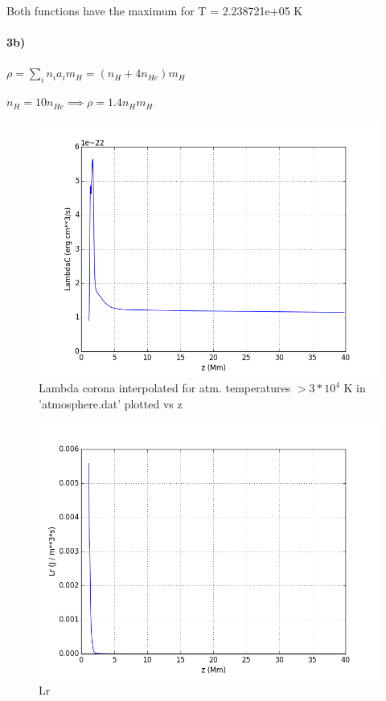 \documentclass[10pt]{book}
\begin{document}
Both functions have the maximum for T = 2.238721e+05 K

\paragraph{3b)}

$\rho = \sum_i n_i a_i m_H = (n_H + 4 n_{He}) m_H $

$n_H = 10 n_{He} \implies \rho = 1.4 n_H m_H$

\begin{figure}[H]
 \centering
 \includegraphics[scale=0.5]{interpLambdaC.png}
 \caption{ Lambda corona interpolated for atm. temperatures $> 3 * 10^4$ K in 'atmosphere.dat' plotted vs z}
\end{figure}

\begin{figure}[H]
 \centering
 \includegraphics[scale=0.5]{Lr.png}
 \caption{ Lr}
\end{figure}
\end{document}
